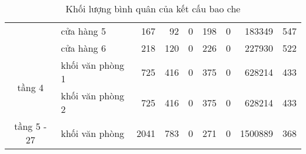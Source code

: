 \begin{landscape}
\begin{table}[H]
\begin{tabular}{|c|l|r|r|r|r|r|r|r|}
		\cline{2-9}         & cửa hàng 5 & 167      & 92       & 0        & 198      & 0        & 183349   & 547 \bigstrut\\
		\cline{2-9}         & cửa hàng 6 & 218      & 120      & 0        & 226      & 0        & 227930   & 522 \bigstrut\\
		\hline
		\multirow{2}[4]{*}{tầng 4} & khối văn phòng 1 & 725      & 416      & 0        & 375      & 0        & 628214   & 433 \bigstrut\\
		\cline{2-9}         & khối văn phòng 2 & 725      & 416      & 0        & 375      & 0        & 628214   & 433 \bigstrut\\
		\hline
		tầng 5 - 27 & khối văn phòng & 2041     & 783      & 0        & 271      & 0        & 1500889  & 368 \bigstrut\\
		\hline
	\end{tabular}%
	\caption{Khối lượng bình quân của kết cấu bao che}
	\label{b:klkcbc}%
\end{table}%
\end{landscape}

